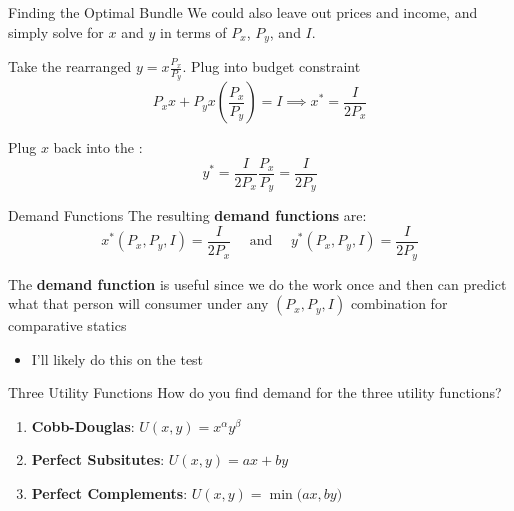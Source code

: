 \documentclass[12pt,t]{beamer}
\begin{document}
\begin{frame}{Finding the Optimal Bundle}
  We could also leave out prices and income, and simply solve for $x$ and $y$ in terms of $P_x$, $P_y$, and $I$.
  
  \bigskip
  Take the rearranged  $y = x\frac{P_x}{P_y}$. Plug into budget constraint
  $$
    P_x x + P_y x (\frac{P_x}{P_y}) = I \implies x^* = \frac{I}{2P_x}
  $$ 
  
  \bigskip
  Plug $x$ back into the :
  $$
    y^* = \frac{I}{2P_x}\frac{P_x}{P_y} = \frac{I}{2P_y}
  $$
\end{frame}

\begin{frame}{Demand Functions}
  The resulting \textbf{demand functions} are:
  $$
    x^*(P_x, P_y, I) =  \frac{I}{2P_x} 
    \quad\text{ and }\quad
    y^*(P_x, P_y, I) = \frac{I}{2P_y}
  $$

  \pause\bigskip
  The \textbf{demand function} is useful since we do the work once and then can predict what that person will consumer under any $(P_x, P_y, I)$ combination for comparative statics
  \begin{itemize}
    \item I'll likely do this on the test
  \end{itemize}
\end{frame}

\begin{frame}{Three Utility Functions}
  How do you find demand for the three utility functions?
  \begin{enumerate}
    \item \textbf{Cobb-Douglas}: $U(x,y) = x^\alpha y^\beta$
    
    \vspace{1.4cm}
    \item \textbf{Perfect Subsitutes}: $U(x,y) = ax + by$
    
    \vspace{1.4cm}
    \item \textbf{Perfect Complements}: $U(x,y) = \min\big(ax, by\big)$
  \end{enumerate}
\end{frame}
\end{document}

